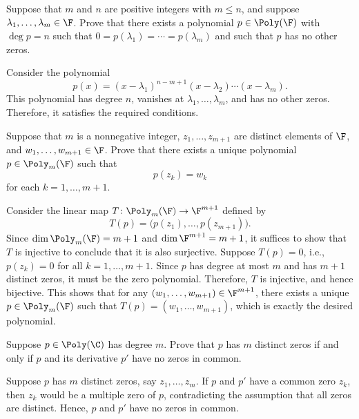 \begin{exc}
\begin{exercise}
Suppose that $m$ and $n$ are positive integers with $m\le n$, and suppose
$\lambda_1,\dots,\lambda_m\in\F$. Prove that there exists a polynomial
$p\in\Poly(\F)$ with $\deg p=n$ such that
$0=p(\lambda_1)=\cdots=p(\lambda_m)$ and such that $p$ has no other zeros.
\end{exercise}
\begin{solution}
Consider the polynomial
\[ p(x)=(x-\lambda_1)^{n-m+1}(x-\lambda_2)\cdots(x-\lambda_m). \]
This polynomial has degree $n$, vanishes at $\lambda_1,\dots,\lambda_m$, and
has no other zeros. Therefore, it satisfies the required conditions.
\end{solution}

\begin{exercise}
Suppose that $m$ is a nonnegative integer, $z_1,\dots,z_{m+1}$ are distinct
elements of $\F$, and $w_1,\dots,w_{m+1}\in\F$. Prove that there exists a
unique polynomial $p\in\Poly_m(\F)$ such that
\[ p(z_k)=w_k \]
for each $k=1,\dots,m+1$.
\end{exercise}
\begin{solution}
Consider the linear map $T\colon\Poly_m(\F)\to\F^{m+1}$ defined by
\[ T(p)=\bigl(p(z_1),\dots,p(z_{m+1})\bigr). \]
Since $\dim\Poly_m(\F)=m+1$ and $\dim\F^{m+1}=m+1$, it suffices to show that
$T$ is injective to conclude that it is also surjective. Suppose $T(p)=0$,
i.e., $p(z_k)=0$ for all $k=1,\dots,m+1$. Since $p$ has degree at most $m$ and
has $m+1$ distinct zeros, it must be the zero polynomial. Therefore, $T$ is
injective, and hence bijective. This shows that for any
$(w_1,\dots,w_{m+1})\in\F^{m+1}$, there exists a unique $p\in\Poly_m(\F)$ such
that $T(p)=(w_1,\dots,w_{m+1})$, which is exactly the desired polynomial.
\end{solution}

\begin{exercise}
Suppose $p\in\Poly(\C)$ has degree $m$. Prove that $p$ has $m$ distinct zeros
if and only if $p$ and its derivative $p'$ have no zeros in common.
\end{exercise}
\begin{solution}
Suppose $p$ has $m$ distinct zeros, say $z_1,\dots,z_m$. If $p$ and $p'$ have
a common zero $z_k$, then $z_k$ would be a multiple zero of $p$, contradicting
the assumption that all zeros are distinct. Hence, $p$ and $p'$ have no zeros
in common.


\end{solution}
\end{exc}
